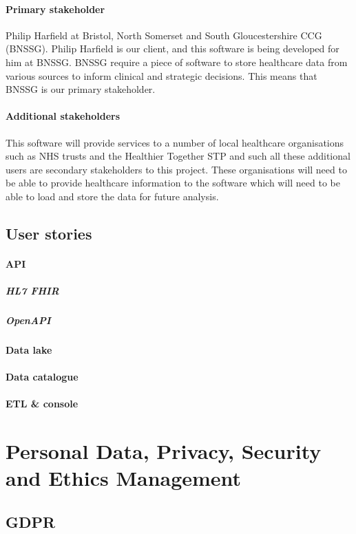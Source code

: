 \documentclass[10pt]{article}
\begin{document}
\paragraph{Primary stakeholder}
Philip Harfield at Bristol, North Somerset and South Gloucestershire CCG (BNSSG). Philip Harfield is our client, and this software is being developed for him at BNSSG. BNSSG require a piece of software to store healthcare data from various sources to inform clinical and strategic decisions. This means that BNSSG is our primary stakeholder.
\paragraph{Additional stakeholders}
This software will provide services to a number of local healthcare organisations such as NHS trusts and the Healthier Together STP and such all these additional users are secondary stakeholders to this project. These organisations will need to be able to provide healthcare information to the software which will need to be able to load and store the data for future analysis.

\subsection{User stories}
\paragraph{API}
\subparagraph{HL7 FHIR}
\subparagraph{OpenAPI}

\paragraph{Data lake}
\paragraph{Data catalogue}
\paragraph{ETL \& console}

\newpage

\section{Personal Data, Privacy, Security and Ethics Management}
\subsection{GDPR}
\end{document}
